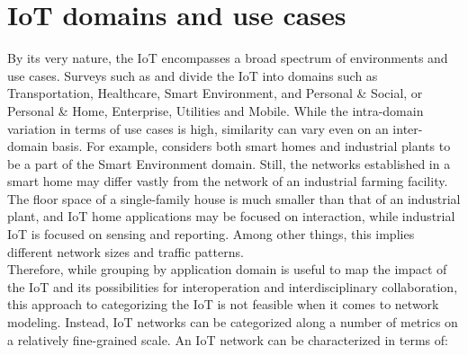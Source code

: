 \documentclass{acm_proc_article-sp}
\begin{document}
\section{IoT domains and use cases}
\label{sec:Scenarios}
By its very nature, the IoT encompasses a broad spectrum of environments and use cases.
Surveys such as \cite{IoT_survey_Atzori} and \cite{IoT_survey_Gubbi} divide the IoT into domains such as Transportation, Healthcare, Smart Environment, and Personal \& Social, or Personal \& Home, Enterprise, Utilities and Mobile. While the intra-domain variation in terms of use cases is high, similarity can vary even on an inter-domain basis. For example,\cite{IoT_survey_Atzori} considers both smart homes and industrial plants to be a part of the Smart Environment domain. Still, the networks established in a smart home may differ vastly from the network of an industrial farming facility. The floor space of a single-family house is much smaller than that of an industrial plant, and IoT home applications may be focused on interaction, while industrial IoT is focused on sensing and reporting.
Among other things, this implies different network sizes and traffic patterns.\\
Therefore, while grouping by application domain is useful to map the impact of the IoT and its possibilities for interoperation and interdisciplinary collaboration, this approach to categorizing the IoT is not feasible when it comes to network modeling. Instead, IoT networks can be categorized along a number of metrics on a relatively fine-grained scale. An IoT network can be characterized in terms of:\\
\end{document}
